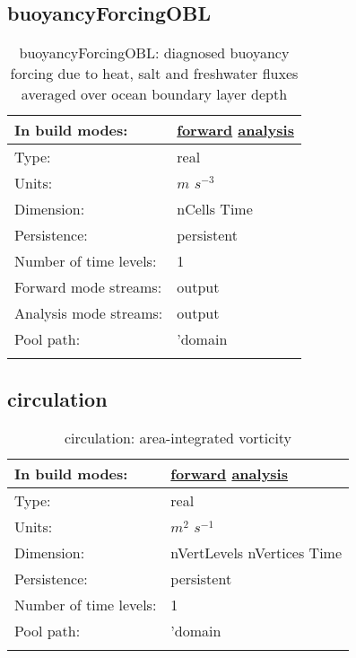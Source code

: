 \subsection[buoyancyForcingOBL]{buoyancyForcingOBL}
\label{subsec:var_sec_diagnostics_buoyancyForcingOBL}
\begin{center}
\begin{longtable}{| p{2.0in} | p{4.0in} |}
        \hline 
        In build modes: & \hyperref[subsec:forward_var_tab_diagnostics]{forward} \hyperref[subsec:analysis_var_tab_diagnostics]{analysis} \\
        \hline 
        Type: & real \\
        \hline 
        Units: & $m$ $s^{-3}$ \\
        \hline 
        Dimension: & nCells Time \\
        \hline 
        Persistence: & persistent \\
        \hline 
        Number of time levels: & 1 \\
        \hline 
		 Forward mode streams: &  output \\
        \hline 
		 Analysis mode streams: &  output \\
        \hline 
            Pool path: & 'domain %
 \\
		 \hline 
    \caption{buoyancyForcingOBL: diagnosed buoyancy forcing due to heat, salt and freshwater fluxes averaged over ocean boundary layer depth}
\end{longtable}
\end{center}
\subsection[circulation]{circulation}
\label{subsec:var_sec_diagnostics_circulation}
\begin{center}
\begin{longtable}{| p{2.0in} | p{4.0in} |}
        \hline 
        In build modes: & \hyperref[subsec:forward_var_tab_diagnostics]{forward} \hyperref[subsec:analysis_var_tab_diagnostics]{analysis} \\
        \hline 
        Type: & real \\
        \hline 
        Units: & $m^2$ $s^{-1}$ \\
        \hline 
        Dimension: & nVertLevels nVertices Time \\
        \hline 
        Persistence: & persistent \\
        \hline 
        Number of time levels: & 1 \\
        \hline 
            Pool path: & 'domain %
 \\
		 \hline 
    \caption{circulation: area-integrated vorticity}
\end{longtable}
\end{center}
